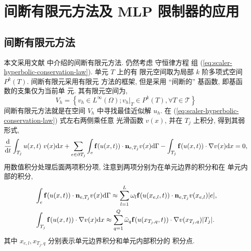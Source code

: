 
\chapter{间断有限元方法及 MLP 限制器的应用}
\label{chap:dg-mlp}

\section{间断有限元方法}
\label{sec:dg-method}

本文采用文献 \cite{Cockburn1998} 中介绍的间断有限元方法. 仍然考虑
守恒律方程
组 (\ref{eq:scaler-hyperbolic-conservation-law}). 单元 $T$ 上的有
限元空间取为局部 $k$ 阶多项式空间 $P^{k}(T)$. 间断有限元采用有限元
方法的框架, 但是采用 ``间断的'' 基函数, 即基函数的支集仅为当前单
元. 其有限元空间为,
\begin{equation}
  \label{eq:funciton-space-discontinuous-galerkin}
  V_{h} = \left\{ v_{h} \in L^{\infty}(\Omega) ; v_{h}|_{T} \in
    P^{k}(T), \forall T \in \mathcal{T} \right\}
\end{equation}
间断有限元方法就是在空间 $V_{h}$ 中寻找最佳近似解 ${{u}}_{h}$.
在 (\ref{eq:scaler-hyperbolic-conservation-law}) 式左右两侧乘任意
光滑函数 $v(x)$, 并在 $T_{j}$ 上积分, 得到其弱形式,
\begin{equation}
  \label{eq:scaler-hyperbolic-conservation-law-weak-form}
  \frac{\mathrm{d}}{\mathrm{d} t} \int_{T_{j}} u(x,t) ~ v (x) \mathrm{d} x +
  \sum_{e\in \partial T_{j}} \int_{e} {\bf{f}} (u(x,t)) \cdot
  {\bf{n}}_{e,T_{j}} v(x) \mathrm{d} \Gamma - \int_{T_{j}}
  {\bf{f}}(u(x,t)) \cdot \nabla v(x) \mathrm{d} x =0,
\end{equation}
用数值积分处理后面两项积分项, 注意到两项分别为在单元边界的积分和在
单元内部的积分,
\begin{equation}
  \label{eq:DG-quadrature-rule}
  \begin{aligned}
    & \int_{e} {\bf{f}} (u(x,t)) \cdot {\bf{n}}_{e,T_{j}}
    v(x) \mathrm{d} \Gamma \approx \sum_{l=1}^{L} \omega_{l} {\bf{f}}
    (u(x_{e,l},t)) \cdot {\bf{n}}_{e,T_{j}} v(x_{e,l}) \vert e
    \vert,\\
    & \int_{T_{j}} {\bf{f}}(u(x,t)) \cdot \nabla v(x) \mathrm{d} x
    \approx \sum_{q=1}^{Q} \bar{\omega}_{q}
    {\bf{f}}(u(x_{T_{j},q},t)) \cdot \nabla v(x_{T_{j},q}) \vert T_{j} \vert.
  \end{aligned}
\end{equation}
其中 $x_{e,l}, x_{T_{j},q}$ 分别表示单元边界积分和单元内部积分的
积分点.


